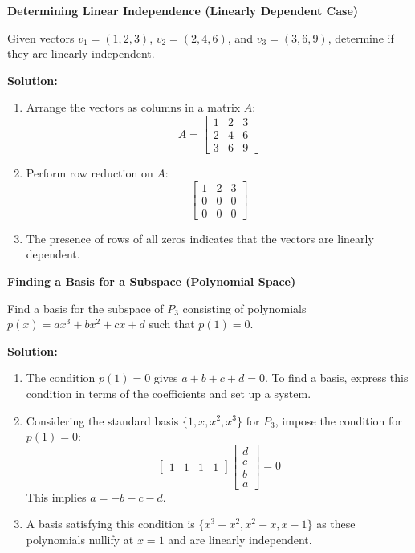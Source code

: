 \documentclass[8pt, a4paper, landscape]{extarticle}
\begin{document}
\begin{multicols*}{4}
  \textbf{Determining Linear Independence (Linearly Dependent Case)}

  Given vectors $v_1 = (1, 2, 3)$, $v_2 = (2, 4, 6)$, and $v_3 = (3, 6, 9)$, determine if they are linearly independent.

  \textbf{Solution:}
  \begin{enumerate}
    \item Arrange the vectors as columns in a matrix $A$:
          \[
            A = \begin{bmatrix}
              1 & 2 & 3 \\
              2 & 4 & 6 \\
              3 & 6 & 9
            \end{bmatrix}
          \]
    \item Perform row reduction on $A$:
          \[
            \begin{bmatrix}
              1 & 2 & 3 \\
              0 & 0 & 0 \\
              0 & 0 & 0
            \end{bmatrix}
          \]
    \item The presence of rows of all zeros indicates that the vectors are linearly dependent.
  \end{enumerate}

  \textbf{Finding a Basis for a Subspace (Polynomial Space)}

  Find a basis for the subspace of $P_3$ consisting of polynomials $p(x) = ax^3 + bx^2 + cx + d$ such that $p(1) = 0$.

  \textbf{Solution:}
  \begin{enumerate}
    \item The condition $p(1) = 0$ gives $a + b + c + d = 0$. To find a basis, express this condition in terms of the coefficients and set up a system.
    \item Considering the standard basis $\{1, x, x^2, x^3\}$ for $P_3$, impose the condition for $p(1) = 0$:
          \[
            \begin{bmatrix}
              1 & 1 & 1 & 1
            \end{bmatrix}
            \begin{bmatrix}
              d \\
              c \\
              b \\
              a
            \end{bmatrix}
            = 0
          \]
          This implies $a = -b - c - d$.
    \item A basis satisfying this condition is $\{x^3 - x^2, x^2 - x, x - 1\}$ as these polynomials nullify at $x = 1$ and are linearly independent.
  \end{enumerate}


\end{multicols*}
\end{document}
